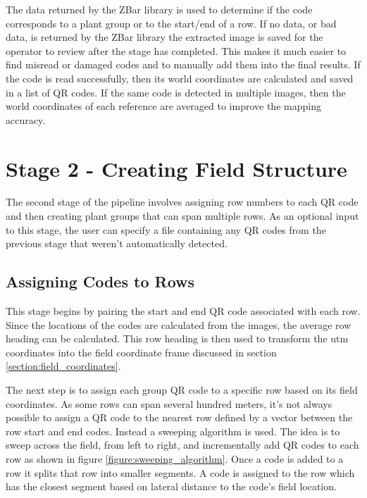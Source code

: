 The data returned by the ZBar library is used to determine if the code corresponds to a plant group or to the start/end of a row.  If no data, or bad data, is returned by the ZBar library the extracted image is saved for the operator to review after the stage has completed.  This makes it much easier to find misread or damaged codes and to manually add them into the final results.  If the code is read successfully, then its world coordinates are calculated and saved in a list of QR codes.   If the same code is detected in multiple images, then the world coordinates of each reference are averaged to improve the mapping accuracy.

\section{Stage 2 - Creating Field Structure}
\label{processing-stage2}

The second stage of the pipeline involves assigning row numbers to each QR code and then creating plant groups that can span multiple rows.  As an optional input to this stage, the user can specify a file containing any QR codes from the previous stage that weren't automatically detected.  

\subsection{Assigning Codes to Rows}

This stage begins by pairing the start and end QR code associated with each row.  Since the locations of the codes are calculated from the images, the average row heading can be calculated.  This row heading is then used to transform the \ac{utm} coordinates into the field coordinate frame discussed in section \ref{section:field_coordinates}.

The next step is to assign each group QR code to a specific row based on its field coordinates.  As some rows can span several hundred meters, it's not always possible to assign a QR code to the nearest row defined by a vector between the row start and end codes.  Instead a sweeping algorithm is used.   The idea is to sweep across the field, from left to right, and incrementally add QR codes to each row as shown in figure \ref{figure:sweeping_algorithm}. Once a code is added to a row it splits that row into smaller segments.  A code is assigned to the row which has the closest segment based on lateral distance to the code's field location. 

